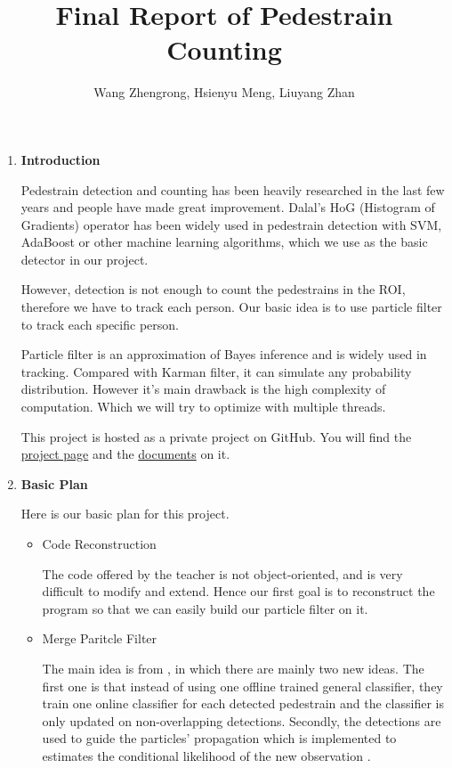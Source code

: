 \documentclass[a4paper]{article}
\title{Final Report of Pedestrain Counting}
\author{Wang Zhengrong, Hsienyu Meng, Liuyang Zhan}
\begin{document}
\maketitle
\begin{enumerate}
\item \textbf{Introduction}

Pedestrain detection and counting has been heavily researched in the last few years and people have made great improvement. Dalal's HoG (Histogram of Gradients) operator has been widely used in pedestrain detection with SVM, AdaBoost or other machine learning algorithms, which we use as the basic detector in our project.

However, detection is not enough to count the pedestrains in the ROI, therefore we have to track each person. Our basic idea is to use particle filter to track each specific person.

Particle filter is an approximation of Bayes inference and is widely used in tracking. Compared with Karman filter, it can simulate any probability distribution. However it's main drawback is the high complexity of computation. Which we will try to optimize with multiple threads.

This project is hosted as a private project on GitHub. You will find the \href{https://zerowong.github.io/PedestrainCounting}{project page} and the \href{https://zerowong.github.io/PedestrainCounting/docs/html/index.html}{documents} on it.

\item \textbf{Basic Plan}

Here is our basic plan for this project.

\begin{itemize}
\item Code Reconstruction

The code offered by the teacher is not object-oriented, and is very difficult to modify and extend. Hence our first goal is to reconstruct the program so that we can easily build our particle filter on it.

\item Merge Paritcle Filter

The main idea is from \cite{eth_biwi_00633}, in which there are mainly two new ideas. The first one is that instead of using one offline trained general classifier, they train one online classifier for each detected pedestrain and the classifier is only updated on non-overlapping detections. Secondly, the detections are used to guide the particles' propagation which is implemented to estimates the conditional likelihood of the new observation .


\end{itemize}
\end{enumerate}
\end{document}
